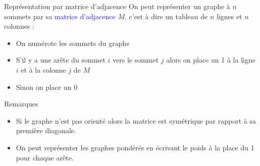 \documentclass[10pt]{beamer}
\begin{document}
\begin{frame}[fragile]{\Ctitle}{\stitle}
	\begin{alertblock}{Représentation par matrice d'adjacence}
		On peut représenter un graphe à $n$ sommets par sa \textcolor{blue}{matrice d'adjacence} $M$, c'est à dire un tableau de $n$ lignes et $n$ colonnes :
		\begin{itemize}
			\item<2-> On numérote les sommets du graphe
			\item<3-> S'il y a une arête du sommet $i$ vers le sommet $j$ alors on place un 1 à la ligne $i$ et à la colonne $j$ de $M$
			\item<4-> Sinon on place un 0
		\end{itemize}
	\end{alertblock}
	\begin{block}{Remarques}
		\begin{itemize}
			\item<5-> Si le graphe n'est pas orienté alors la matrice est symétrique par rapport à sa première diagonale.
			\item<6-> On peut représenter les graphes pondérés en écrivant le poids à la place du 1 pour chaque arête.
		\end{itemize}
	\end{block}
\end{frame}
\end{document}
